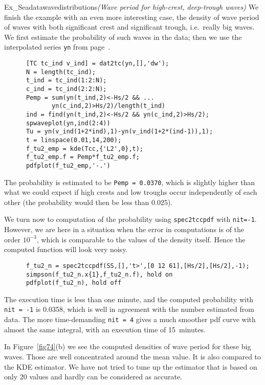 \begin{cex}{Ex_Seadatawavedistributions}{\sl (Wave period for high-crest, deep-trough waves)}
We finish the example with an even more
interesting case, the density of wave period of waves with both
significant crest and significant trough, i.e.\ really big waves.
We  first estimate the probability of such waves in the data; then we
use the interpolated series {\tt yn} from page~\pageref{Interpol_yn}.
{\small\begin{verbatim}
      [TC tc_ind v_ind] = dat2tc(yn,[],'dw');
      N = length(tc_ind);
      t_ind = tc_ind(1:2:N);
      c_ind = tc_ind(2:2:N);
      Pemp = sum(yn(t_ind,2)<-Hs/2 && ...
             yn(c_ind,2)>Hs/2)/length(t_ind)
      ind = find(yn(t_ind,2)<-Hs/2 && yn(c_ind,2)>Hs/2);
      spwaveplot(yn,ind(2:4))
      Tu = yn(v_ind(1+2*ind),1)-yn(v_ind(1+2*(ind-1)),1);
      t = linspace(0.01,14,200);
      f_tu2_emp = kde(Tcc,{'L2',0},t);
      f_tu2_emp.f = Pemp*f_tu2_emp.f;
      pdfplot(f_tu2_emp,'-.')
\end{verbatim}}

The probability is estimated to be
\verb+Pemp = 0.0370+, which is slightly higher
than what we could expect if high crests and low troughs occur
independently of each other (the probability would then be less than 0.025).

We turn now to computation of the probability using {\tt spec2tccpdf}
with {\tt nit=-1}. However, we are here in a situation when the
error in computations is of the order $10^{-3}$, which is comparable
to the values of the density itself. Hence the computed function
will look very noisy.
{\small\begin{verbatim}
      f_tu2_n = spec2tccpdf(SS,[],'t>',[0 12 61],[Hs/2],[Hs/2],-1);
      simpson(f_tu2_n.x{1},f_tu2_n.f), hold on
      pdfplot(f_tu2_n), hold off
\end{verbatim}}

The execution time is less than one minute, and the
computed probability with \verb+nit = -1+ is 0.0358,
which is well in agreement with the number estimated from data. 
The more time-demanding \verb+nit = 4+ gives a much smoother 
pdf curve with almost the same integral, with an execution time of 15~minutes.


In Figure~\ref{fig74}(b) we see the computed densities of wave
period for these big waves. Those are well concentrated around the
mean value. It is also compared to the KDE estimator. We have not tried to
tune up the estimator that is based on only 20 values and hardly can
be considered as accurate.\end{cex}

